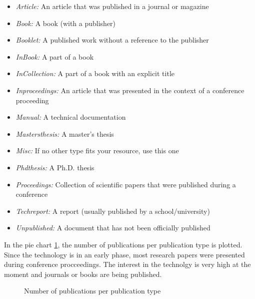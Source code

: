 \begin{itemize}[noitemsep]
	\item \textit{Article:} An article that was published in a journal or magazine
	\item \textit{Book:} A book (with a publisher)
	\item \textit{Booklet:} A published work without a reference to the publisher 
	\item \textit{InBook:} A part of a book 
	\item \textit{InCollection:} A part of a book with an explicit title
	\item \textit{Inproceedings:} An article that was presented in the context of a conference proceeding 
	\item \textit{Manual:} A technical documentation 
	\item \textit{Mastersthesis:} A master’s thesis
	\item \textit{Misc:} If no other type fits your resource, use this one 
	\item \textit{Phdthesis:} A Ph.D. thesis 
	\item \textit{Proceedings:} Collection of scientific papers that were published during a conference 
	\item \textit{Techreport:} A report (usually published by a school/university) 
	\item \textit{Unpublished:} A document that has not been officially published
\end{itemize}
\clearpage
In the pie chart \ref{fig:rq2_publication_type}, the number of publications per publication type is plotted. Since the technology is in an early phase, most research papers were presented during conference procceedings. The interest in the technolgy is very high at the moment and journals or books are being published.
\begin{figure}[!ht]
	\centering
	\caption{Number of publications per publication type} 	
	\label{fig:rq2_publication_type}
\end{figure}


\clearpage

